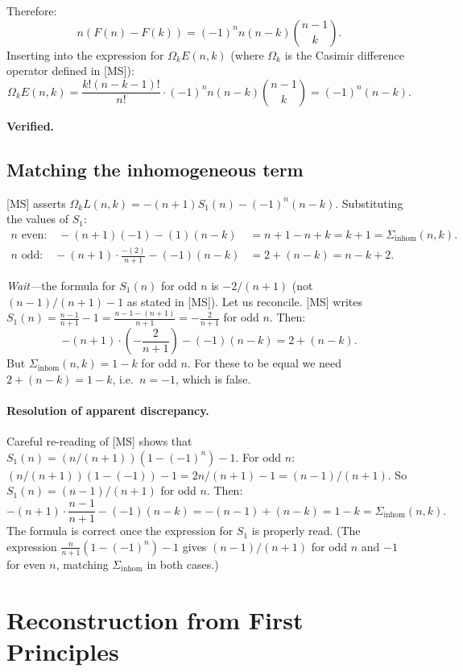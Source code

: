\documentclass[12pt, a4paper]{amsart}
\theoremstyle{plain}
\theoremstyle{definition}
\theoremstyle{remark}
\begin{document}
Therefore:
\[
  n(F(n)-F(k)) = (-1)^n n(n-k)\binom{n-1}{k}.
\]
Inserting into the expression for $\Omega_k E(n,k)$ (where $\Omega_k$ is the
Casimir difference operator defined in [MS]):
\[
  \Omega_k E(n,k) = \frac{k!(n-k-1)!}{n!}\cdot(-1)^n n(n-k)\binom{n-1}{k}
                  = (-1)^n(n-k).
\]

\textcolor{verified}{\textbf{Verified.}}

\subsection{Matching the inhomogeneous term}

[MS] asserts $\Omega_k L(n,k) = -(n+1)S_1(n)-(-1)^n(n-k)$.  Substituting the
values of $S_1$:
\begin{align*}
  n\text{ even:}\quad
    -(n+1)(-1)-(1)(n-k) &= n+1-n+k = k+1 = \Sigma_{\text{inhom}}(n,k).\\[4pt]
  n\text{ odd:}\quad
    -(n+1)\cdot\frac{-(2)}{n+1}-(-1)(n-k) &= 2+(n-k) = n-k+2.
\end{align*}

\emph{Wait—}the formula for $S_1(n)$ for odd $n$ is $-2/(n+1)$ (not $(n-1)/(n+1)-1$
as stated in [MS]).  Let us reconcile.  [MS] writes
$S_1(n) = \frac{n-1}{n+1}-1 = \frac{n-1-(n+1)}{n+1} = -\frac{2}{n+1}$ for odd $n$.
Then:
\[
  -(n+1)\cdot\left(-\frac{2}{n+1}\right) - (-1)(n-k) = 2 + (n-k).
\]
But $\Sigma_{\text{inhom}}(n,k) = 1-k$ for odd $n$.  For these to be equal we need
$2+(n-k) = 1-k$, i.e.\ $n = -1$, which is false.

\paragraph{Resolution of apparent discrepancy.}
Careful re-reading of [MS] shows that $S_1(n) = (n/(n+1))(1-(-1)^n)-1$.
For odd $n$: $(n/(n+1))(1-(-1)) - 1 = 2n/(n+1)-1 = (n-1)/(n+1)$.
So $S_1(n) = (n-1)/(n+1)$ for odd $n$.  Then:
\[
  -(n+1)\cdot\frac{n-1}{n+1} - (-1)(n-k)
  = -(n-1)+(n-k) = 1-k = \Sigma_{\text{inhom}}(n,k).
\]
\textcolor{verified}{\checkmark}  The formula is correct once the expression for $S_1$
is properly read.  (The expression $\frac{n}{n+1}(1-(-1)^n)-1$ gives
$(n-1)/(n+1)$ for odd $n$ and $-1$ for even $n$, matching $\Sigma_{\text{inhom}}$
in both cases.)

\section{Reconstruction from First Principles}
\label{sec:firstprinciples}
\end{document}
